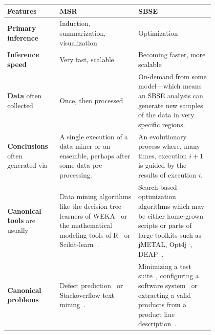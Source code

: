 \documentclass[sigconf]{acmart}
\begin{document}
\begin{figure}[t]
    \centering
    \small
    \begin{tabular}{@{}p{3cm}p{6cm}p{8.35cm}@{}}
                
                \toprule
                \textbf{Features} & \hspace{2cm}\textbf{MSR} & \hspace{3cm}\textbf{SBSE} \\ \midrule
                \rowcolor[HTML]{EFEFEF} \textbf{Primary inference} & Induction, summarization, visualization & Optimization \\
                \textbf{Inference speed} & Very fast, scalable & Becoming faster, more scalable\\
                \rowcolor[HTML]{EFEFEF}\textbf{Data} often collected &
                 Once,  then processed.
                &
                On-demand
                from  some model---which means an SBSE analysis can 
                generate new samples of the data in very  specific regions.
                \\ 
                \textbf{Conclusions} often 
                generated via
                &
                A single  execution of a data miner or an ensemble, 
                perhaps after some data pre-processing. 
                &
                An evolutionary process  where, many times, execution $i+1$ is guided
                by the results of execution $i$.
                \\ 
                 
                \rowcolor[HTML]{EFEFEF}\textbf{Canonical   tools} are usually
                &
                Data mining algorithms like  the decision
                tree learners of WEKA~\cite{hall2009weka} or the mathematical modeling tools of R~\cite{rmanual18} or Scikit-learn~\cite{scikit-learn}.
                &
                {Search-based} optimization algorithms which may be either home-grown scripts or parts of large toolkits such as jMETAL\cite{refs2jmetalDEE}, Opt4j~\cite{opt4jpaper}, DEAP~\cite{DEAP_JMLR2012}.
                \\ 
                \textbf{Canonical   problems}
                &
                Defect prediction~\cite{lessmann2008benchmarking}   or Stackoverflow text mining~\cite{fu2017easy}. 
                &
                Minimizing a test suite~\cite{fraser2007redundancy}, configuring a software system~\cite{nair2017faster} or extracting a valid products from a product line description~\cite{sayyad13b}.
                \\ 
                

\end{tabular}
\end{figure}
\end{document}
